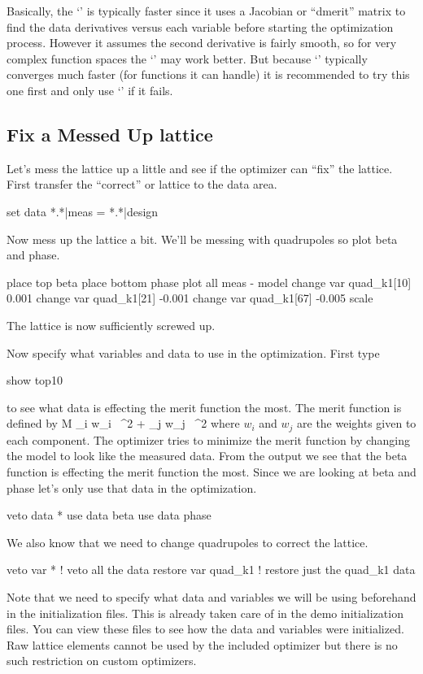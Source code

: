 Basically, the `' is typically faster since it uses a Jacobian
or ``dmerit'' matrix to find the data derivatives versus each variable
before starting the optimization process.  However it assumes the
second derivative is fairly smooth, so for very complex function
spaces the `' may work better. But because `' typically
converges much faster (for functions it can handle) it is recommended
to try this one first and only use `' if it fails.

\subsection{Fix a Messed Up lattice}
\label{ss:fix_it}

Let's mess the lattice up a little and see if the optimizer can
``fix'' the lattice. First transfer the ``correct'' or 
lattice to the  data area.
\begin{example}
  set data *.*|meas = *.*|design
\end{example}
Now mess up the lattice a bit. We'll be messing with quadrupoles so
plot beta and phase.
\begin{example}
  place top beta
  place bottom phase
  plot all meas - model
  change var quad\_k1[10] 0.001
  change var quad\_k1[21] -0.001
  change var quad\_k1[67] -0.005
  scale
\end{example}
The lattice is now sufficiently screwed up.

Now specify what variables and data to use in the optimization. First type
\begin{example}
  show top10
\end{example}
to see what data is effecting the merit function the most. The merit
function is defined by
\Begineq
  {\cal M} \equiv \sum_{i} w_i \,
    ^2 + 
  \sum_{j} w_j \,
    ^2
  \label{eq:merit}
\Endeq
where $w_{i}$ and $w_{j}$ are the weights given to each component.
The optimizer tries to minimize the merit function by changing the
model to look like the measured data. From the  output we
see that the beta function is effecting the merit function the
most. Since we are looking at beta and phase let's only use that data
in the optimization.
\begin{example}
  veto data *
  use  data beta
  use  data phase
\end{example}
We also know that we need to change quadrupoles to correct the lattice.
\begin{example}
  veto var *          ! veto all the data
  restore var quad\_k1 ! restore just the quad\_k1 data
\end{example}
Note that we need to specify what data and variables we will be using
beforehand in the initialization files. This is already taken care of
in the demo initialization files. You can view these files to see how
the data and variables were initialized. Raw lattice elements cannot
be used by the included optimizer but there is no such restriction on
custom optimizers.

